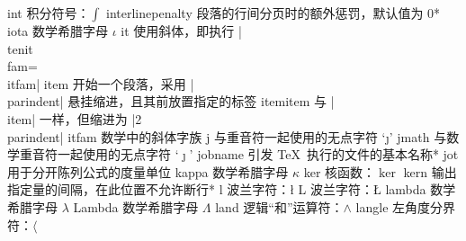 \capcs int {积分符号：$\int$}{}{}
\capcs interlinepenalty {段落的行间分页时的额外惩罚，默认值为 0}*{}
\capcs iota {数学希腊字母 $\iota$}{}{}
\capcs it {使用斜体，即执行 |\\tenit\\fam=\\itfam|}{}{}
\capcs item {开始一个段落，采用 |\\parindent| 悬挂缩进，且其前放置指定的标签}{}{}
\capcs itemitem {与 |\\item| 一样，但缩进为 |2\\parindent|}{}{}
\capcs itfam {数学中的斜体字族}{}{}
\capcs j {与重音符一起使用的无点字符 `\j'}{}{}
\capcs jmath {与数学重音符一起使用的无点字符 `$\jmath$'}{}{}
\capcs jobname {引发 \TeX\ 执行的文件的基本名称}*{}
\capcs jot {用于分开陈列公式的度量单位}{}{}
\capcs kappa {数学希腊字母 $\kappa$}{}{}
\capcs ker {核函数：$\ker$}{}{}
\capcs kern {输出指定量的间隔，在此位置不允许断行}*{}
\capcs l {波兰字符：\l}{}{}
\capcs L {波兰字符：\L}{}{}
\capcs lambda {数学希腊字母 $\lambda$}{}{}
\capcs Lambda {数学希腊字母 $\Lambda$}{}{}
\capcs land {逻辑“和”运算符：$\land$}{}{}
\capcs langle {左角度分界符：$\langle$}{}{}
